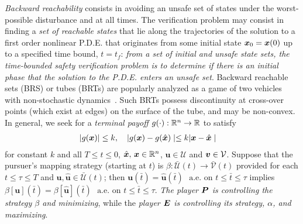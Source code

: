 \noindent   \textit{Backward reachability} consists in avoiding an unsafe set of states under the worst-possible disturbance and at all times. The verification problem may consist in finding a \textit{set of reachable states} that lie along the trajectories of the solution to a first order nonlinear P.D.E. that originates from some initial state $\bm{x}_0 = \bm{x}(0)$ up to a specified time bound, $t=t_f$: \textit{from a set of initial and unsafe state sets, the time-bounded safety verification problem is to determine if there is an initial phase that the solution to the P.D.E. enters an unsafe set}. Backward reachable sets (BRS) or tubes (BRTs) are popularly analyzed as a game of two vehicles with non-stochastic dynamics~\cite{Merz1972}. Such BRTs possess discontinuity at cross-over points (which exist at edges) on the surface of the  tube, and may be non-convex. In general, we seek for a \textit{terminal payoff} $g(\cdot): \mathbb{R}^n \rightarrow \mathbb{R}$ to satisfy
%
	\begin{align}
		| g(\bm{x}) | &\le k, \quad | g(\bm{x}) - g(\hat{\bm{x}}) \mid \le k | \bm{x} - \hat{\bm{x}} \mid
	\end{align}
%
for constant $k$ and all $T \le t \le 0$, $\hat{\bm{x}}, \, \bm{x} \in \mathbb{R}^n$, $\bm{u}\in \mathcal{U}$ and $\bm{v} \in \mathcal{V}$.  %
%
%
Suppose that the pursuer's mapping strategy (starting at $t$) is $\beta: \mathcal{\bar{U}}({t}) \rightarrow \mathcal{\bar{V}}({t})$ provided for each $t \le \tau \le T$ and $\bm{u}, \hat{\bm{u}} \in \mathcal{\bar{U}}({t})$; then $\bm{u}(\bar{t}) = \hat{\bm{u}}(\bar{t}) \,\, \text{ a.e. on } t \le \bar{t}  \le \tau$ implies $\beta[\bm{u}](\bar{t}) = \beta[\hat{\bm{u}}](\bar{t}) \,\, \text{ a.e. on } t \le \bar{t}  \le \tau$. \textit{The player $\bm{P}$ is controlling the strategy $\beta$ and minimizing}, while the \textit{player $\bm{E}$ is controlling its strategy, $\alpha$, and maximizing}. %
%

